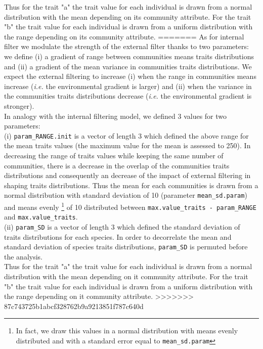 \documentclass[12pt]{article}\usepackage[]{graphicx}\usepackage[]{color}
\begin{document}
\begin{landscape}
\begin{table}[ht]
{ Thus for the trait "a" the trait value for each individual is drawn from a normal distribution with the mean depending on its community attribute. For the trait "b" the trait value for each individual is drawn from a uniform distribution with the range depending on its community attribute.
=======
As for internal filter we modulate the strength of the external filter thanks to two parameters:
we define (i) a gradient of range between communities means traits distributions and (ii) a gradient of the mean variance in communities traits distributions. We expect the external filtering to increase (i) when the range in communities means increase (\textit{i.e.} the environmental gradient is larger) and (ii) when the variance in the communities traits distributions decrease (\textit{i.e.} the environmental gradient is stronger).
\\

In analogy with the internal filtering model, we defined 3 values for two parameters:
\\

 (i) \texttt{param\_{}RANGE.init} is a vector of length 3 which defined the above range for the mean traits values (the maximum value for the mean is assessed to 250). In decreasing the range of traits values while keeping the same number of communities, there is a decrease in the overlap of the communities traits distributions and consequently an decrease of the impact of external filtering in shaping traits distributions. Thus the mean for each communities is drawn from a normal distribution with standard deviation of 10 (parameter \texttt{mean\_{}sd.param}) and means evenly
\footnote{In fact, we draw this values in a normal distribution with means evenly distributed and with a standard error equal to \texttt{mean\_{}sd.param}}
of 10 distributed between \texttt{max.value\_{}traits - param\_{}RANGE} and \texttt{max.value\_{}traits}.
\\

(ii) \texttt{param\_{}SD} is a vector of length 3 which defined the standard deviation of traits distributions for each species. In order to decorrelate the mean and standard deviation of species traits distributions, \texttt{param\_{}SD} is permuted before the analysis. 
\\

 Thus for the trait "a" the trait value for each individual is drawn from a normal distribution with the mean depending on it community attribute. For the trait "b" the trait value for each individual is drawn from a uniform distribution with the range depending on it community attribute.
>>>>>>> 87c743725b1abcf328762b9a9213851f787c640d
 
}
\end{table}
\end{landscape}
\end{document}
